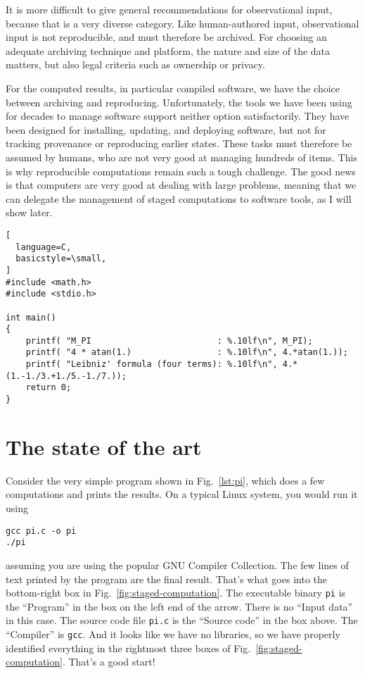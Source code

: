 \documentclass[10pt,journal,compsoc]{IEEEtran}
\begin{document}
It is more difficult to give general recommendations for observational input, because that is a very diverse category. Like human-authored input, observational input is not reproducible, and must therefore be archived. For choosing an adequate archiving technique and platform, the nature and size of the data matters, but also legal criteria such as ownership or privacy.

For the computed results, in particular compiled software, we have the choice between archiving and reproducing. Unfortunately, the tools we have been using for decades to manage software support neither option satisfactorily. They have been designed for installing, updating, and deploying software, but not for tracking provenance or reproducing earlier states. These tasks must therefore be assumed by humans, who are not very good at managing hundreds of items. This is why reproducible computations remain such a tough challenge. The good news is that computers are very good at dealing with large problems, meaning that we can delegate the management of staged computations to software tools, as I will show later.

\begin{figure*}[!t]
\begin{lstlisting}[
  language=C,
  basicstyle=\small,
]
#include <math.h>
#include <stdio.h>

int main()
{
    printf( "M_PI                         : %.10lf\n", M_PI);
    printf( "4 * atan(1.)                 : %.10lf\n", 4.*atan(1.));
    printf( "Leibniz' formula (four terms): %.10lf\n", 4.*(1.-1./3.+1./5.-1./7.));
    return 0;
}
\end{lstlisting}
\caption{A very simple computation in C.}
\label{lst:pi}
\end{figure*}

\section{The state of the art}

Consider the very simple program shown in Fig.~\ref{lst:pi}, which does a few computations and prints the results. On a typical Linux system, you would run it using
\begin{verbatim}
gcc pi.c -o pi
./pi
\end{verbatim}
assuming you are using the popular GNU Compiler Collection. The few lines of text printed by the program are the final result. That's what goes into the bottom-right box in Fig.~\ref{fig:staged-computation}. The executable binary \texttt{pi} is the ``Program'' in the box on the left end of the arrow. There is no ``Input data'' in this case. The source code file \texttt{pi.c} is the ``Source code'' in the box above. The ``Compiler'' is \texttt{gcc}. And it looks like we have no libraries, so we have properly identified everything in the rightmost three boxes of Fig.~\ref{fig:staged-computation}. That's a good start!
\end{document}
